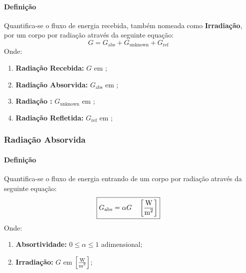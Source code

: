 \documentclass{article}
\begin{document}
            \paragraph{Definição}Quantifica-se o fluxo de energia recebida, também nomeada como \textbf{Irradiação}, por um corpo por radiação através da seguinte equação:
                \begin{equation}
                    \boxed{
                        G = G_{\text{abs}} + G_{\text{unknown}} + G_{\text{ref}}
                    }
                \end{equation}
            Onde:
                \begin{enumerate}[noitemsep]
                    \item \textbf{Radiação Recebida:} $G$ em ;
                    \item \textbf{Radiação Absorvida:} $G_{\text{abs}}$ em ;
                    \item \textbf{Radiação :} $G_{\text{unknown}}$ em ;
                    \item \textbf{Radiação Refletida:} $G_{\text{ref}}$ em ;
                \end{enumerate}

        \subsubsection{Radiação Absorvida}
            \paragraph{Definição}Quantifica-se o fluxo de energia entrando de um corpo por radiação através da seguinte equação:
                \begin{equation}
                    \boxed{
                        G_{\text{abs}} = \alpha G
                        \quad
                        \left[\frac{\text{W}}{\text{m\textsuperscript{2}}}\right]
                    }
                \end{equation}
            Onde:
                \begin{enumerate}[noitemsep]
                    \item \textbf{Absortividade:} $0 \leq \alpha \leq 1$ adimensional;
                    \item \textbf{Irradiação:} $G$ em $\left[\frac{\text{W}}{\text{m\textsuperscript{2}}}\right]$;
                \end{enumerate}
\end{document}
